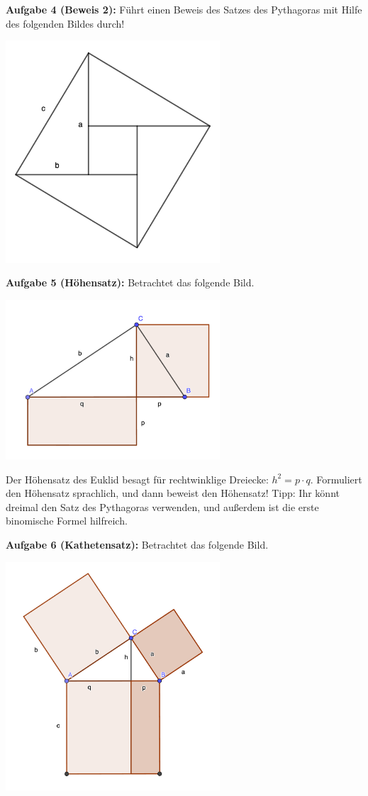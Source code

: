 \documentclass[12pt,a4paper,oneside,ngerman]{article}
\begin{document}
\textbf{Aufgabe 4 (Beweis 2):}  Führt einen Beweis des Satzes des Pythagoras mit Hilfe des folgenden Bildes durch!
\begin{center}
\includegraphics[width=8cm]{satz-des-py-02.png}
\end{center}
\textbf{Aufgabe 5 (Höhensatz):} Betrachtet das folgende Bild.
\begin{center}
\includegraphics[width=8cm]{hoehensatz.png}
\end{center}
Der Höhensatz des Euklid besagt für rechtwinklige Dreiecke: $h^2=p\cdot q$.
Formuliert den Höhensatz sprachlich, und dann beweist den Höhensatz! Tipp: Ihr könnt dreimal den Satz des Pythagoras verwenden, und außerdem ist die erste binomische Formel hilfreich.

\textbf{Aufgabe 6 (Kathetensatz):} Betrachtet das folgende Bild.
\begin{center}
\includegraphics[width=8cm]{kathetensatz.png}
\end{center}
\end{document}
